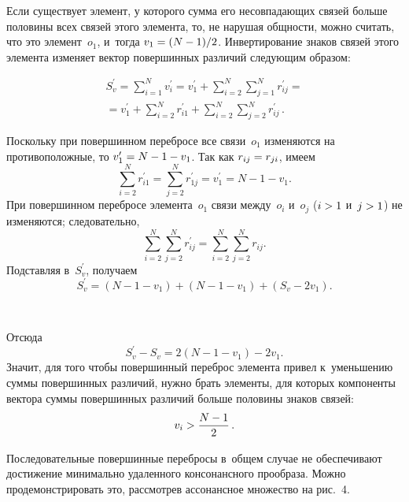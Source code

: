 \begin{multicols}{2}
     Если существует элемент, у которого сумма его несовпадающих связей 
больше половины всех связей этого элемента, то, не нарушая общ\-ности, 
мож\-но считать, что это элемент~$o_1$, и~тогда $v_1\hm= (N\hm-1)/2$. 
Инвертирование знаков связей этого элемента изменяет вектор повершинных 
различий сле\-ду\-ющим образом:

\noindent
    \begin{multline*}
     S_v^\prime =\sum\limits^N_{i=1} v_i^\prime =v^\prime_1 
+\sum\limits_{i=2}^N \sum\limits^N_{j=1} r_{ij}^\prime = {}\\
{}= v_1^\prime + \sum\limits_{i=2}^N r^\prime_{i1} +\sum\limits_{i=2}^N \sum\limits^N_{j=2} r^\prime_{ij}\,.
\end{multline*}
     
     Поскольку при повершинном перебросе все связи~$o_1$ изменяются 
на противоположные, то $v_1^\prime \hm= N\hm- 1 \hm- v_1$. Так как 
$r_{ij}\hm = r_{ji}$, имеем
     $$
     \sum\limits^N_{i=2} r^\prime_{i1} =\sum\limits^N_{j=2} r^\prime_{1j} 
=v_1^\prime = N-1-v_1.
     $$
При повершинном перебросе элемента~$o_1$ связи между~$o_i$ и~$o_j$  ($i 
\hm> 1$ и~$j \hm> 1$) не изменяются; следовательно, 
$$
\sum\limits^N_{i=2} \sum\limits^N_{j=2} r^\prime_{ij} =\sum\limits^N_{i=2} 
\sum\limits^N_{j=2} r_{ij}.
$$
Подставляя в~$S_v^\prime$, получаем
$$
S_v^\prime =  \left( N-1-v_1\right) +\left( N-1-v_1\right) +\left( S_v-2v_1\right).
$$

\begin{figure*} %
\vspace*{1pt}
\begin{center}
   \mbox{%
\epsfxsize=120.915mm
}
\end{center}
\vspace*{-9pt}
\end{figure*}

\noindent
Отсюда
$$
S_v^\prime -S_v= 2\left( N-1-v_1\right) -2v_1.
$$
Значит, для того чтобы повершинный переброс элемента привел 
к~уменьшению суммы повершинных различий, нуж\-но брать элементы, для 
которых компоненты вектора суммы повершинных различий больше 
половины знаков связей:
$$
v_i> \displaystyle\frac{\displaystyle N-1\mathstrut}{\displaystyle 2\mathstrut}\,.
$$
     
     Последовательные повершинные перебросы в~общем случае не 
обеспечивают до\-сти\-же\-ние минимально удаленного консонансного 
прообраза. Можно продемонстрировать это, рас\-смот\-рев ассонансное 
множество на рис.~4.
     

\end{multicols}

